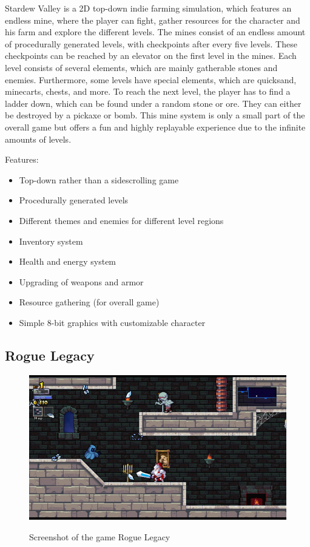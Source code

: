 \documentclass[12p]{article}
\begin{document}
Stardew Valley is a 2D top-down indie farming simulation, which features an endless mine, where the player can fight, gather resources for the character and his farm and explore the different levels. The mines consist of an endless amount of procedurally generated levels, with checkpoints after every five levels. These checkpoints can be reached by an elevator on the first level in the mines. Each level consists of several elements, which are mainly gatherable stones and enemies. Furthermore, some levels have special elements, which are quicksand, minecarts, chests, and more. To reach the next level, the player has to find a ladder down, which can be found under a random stone or ore. They can either be destroyed by a pickaxe or bomb. This mine system is only a small part of the overall game but offers a fun and highly replayable experience due to the infinite amounts of levels.

Features:

\begin{itemize}
    \item Top-down rather than a sidescrolling game
    \item Procedurally generated levels
    \item Different themes and enemies for different level regions
    \item Inventory system
    \item Health and energy system
    \item Upgrading of weapons and armor
    \item Resource gathering (for overall game)
    \item Simple 8-bit graphics with customizable character
\end{itemize}


\subsection{Rogue Legacy}

\begin{figure}[ht]
    \center
    \includegraphics[width=1\textwidth]{StateOfTheArtScreenshots/rogue_legacy}
    \label{StateOfTheArt_Screenshots_RogueLegacy}
    \caption{Screenshot of the game Rogue Legacy \cite{RogueLegacyScreenshot}}
\end{figure}
\end{document}
